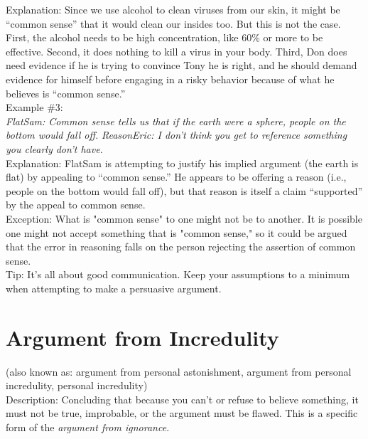 \documentclass[a4paper,12pt,single,pdftex]{scrbook}
\begin{document}
{    
      Explanation: Since we use alcohol to clean viruses from our skin, it might be “common sense” that it would clean our insides too. But this is not the case. First, the alcohol needs to be high concentration, like 60\% or more to be effective. Second, it does nothing to kill a virus in your body. Third, Don does need evidence if he is trying to convince Tony he is right, and he should demand evidence for himself before engaging in a risky behavior because of what he believes is “common sense.”
    \\

    
      Example \#3:
    \\

    
      {\em FlatSam: Common sense tells us that if the earth were a sphere, people on the bottom would fall off.} \newline
{\em ReasonEric: I don’t think you get to reference something you clearly don’t have.}
    \\

    
      Explanation: FlatSam is attempting to justify his implied argument (the earth is flat) by appealing to “common sense.” He appears to be offering a reason (i.e., people on the bottom would fall off), but that reason is itself a claim “supported” by the appeal to common sense.
    \\

    
      Exception: What is "common sense" to one might not be to another. It is possible one might not accept something that is "common sense," so it could be argued that the error in reasoning falls on the person rejecting the assertion of common sense.
    \\

    
      Tip: It's all about good communication. Keep your assumptions to a minimum when attempting to make a persuasive argument.
    \\

    
    

    \chapter{
      Argument from Incredulity
    }
  
    

    
      (also known as:  argument from personal astonishment, argument from personal incredulity, personal incredulity)
    \\

    
      Description: Concluding that because you can't or refuse to believe something, it must not be true, improbable, or the argument must be flawed. This is a specific form of the {\it argument from ignorance}.
    \\

}
\end{document}
